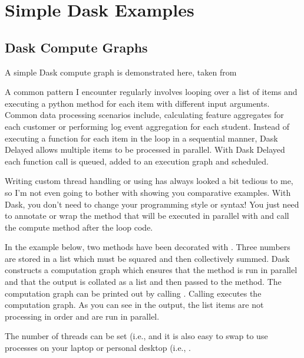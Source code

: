 \chapter{Simple Dask Examples}
\label{chap:SimpleDaskExamples}

\section{Dask Compute Graphs}
\label{sec:DaskComputeGraphs}

A simple Dask compute graph is demonstrated here, taken from 

A common pattern I encounter regularly involves looping over a list of items and executing a python method for each item with different input arguments. Common data processing scenarios include, calculating feature aggregates for each customer or performing log event aggregation for each student. Instead of executing a function for each item in the loop in a sequential manner, Dask Delayed allows multiple items to be processed in parallel. With Dask Delayed each function call is queued, added to an execution graph and scheduled.

Writing custom thread handling or using  has always looked a bit tedious to me, so I'm not even going to bother with showing you comparative examples. With Dask, you don't need to change your programming style or syntax! You just need to annotate or wrap the method that will be executed in parallel with  and call the compute method after the loop code.

In the example below, two methods have been decorated with . Three numbers are stored in a list which must be squared and then collectively summed. Dask constructs a computation graph which ensures that the  method is run in parallel and that the output is collated as a list and then passed to the  method. The computation graph can be printed out by calling . Calling  executes the computation graph. As you can see in the output, the  list items are not processing in order and are run in parallel.

The number of threads can be set (i.e.,  and it is also easy to swap to use processes on your laptop or personal desktop (i.e., .

